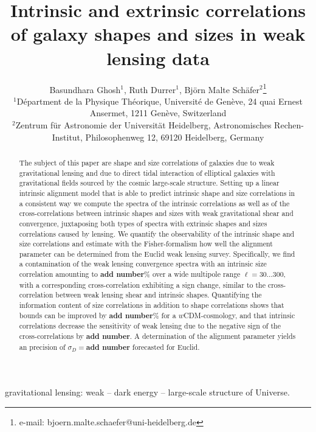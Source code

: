\documentclass[a4paper,fleqn,usenatbib]{mnras}
\title[Intrinsic sizes and shapes of galaxies]
{Intrinsic and extrinsic correlations of galaxy shapes and sizes in weak lensing data}
\author[B. Ghosh, R. Durrer, B.M. Sch{\"a}fer]
{Basundhara Ghosh$^1$, Ruth Durrer$^1$, Bj{\"o}rn Malte Sch{\"a}fer$^2$\thanks{e-mail: bjoern.malte.schaefer@uni-heidelberg.de}\\
$^1$D{\'e}partment de la Physique Th{\'e}orique, Universit{\'e} de Gen{\`e}ve, 24 quai Ernest Ansermet, 1211 Gen{\`e}ve, Switzerland\\
$^2$Zentrum f{\"u}r Astronomie der Universit{\"a}t Heidelberg, Astronomisches Rechen-Institut, Philosophenweg 12, 69120 Heidelberg, Germany
}
\def\spirou#1{{\bf #1}}
\begin{document}
\pagerange{\pageref{firstpage}--\pageref{lastpage}}
\maketitle
\label{firstpage}


\begin{abstract}
The subject of this paper are shape and size correlations of galaxies due to weak gravitational lensing and due to direct tidal interaction of elliptical galaxies with gravitational fields sourced by the cosmic large-scale structure. Setting up a linear intrinsic alignment model that is able to predict intrinsic shape and size correlations in a consistent way we compute the spectra of the intrinsic correlations as well as of the cross-correlations between intrinsic shapes and sizes with weak gravitational shear and convergence, juxtaposing both types of spectra with extrinsic shapes and sizes correlations caused by lensing. We quantify the observability of the intrinsic shape and size correlations and estimate with the Fisher-formalism how well the alignment parameter can be determined from the Euclid weak lensing survey. Specifically, we find a contamination of the weak lensing convergence spectra with an intrinsic size correlation amounting to \spirou{add number}\% over a wide multipole range $\ell=30\ldots300$, with a corresponding cross-correlation exhibiting a sign change, similar to the cross-correlation between weak lensing shear and intrinsic shapes. Quantifying the information content of size correlations in addition to shape correlations shows that bounds can be improved by \spirou{add number}\% for a $w$CDM-cosmology, and that intrinsic correlations decrease the sensitivity of weak lensing due to the negative sign of the cross-correlations by \spirou{add number}. A determination of the alignment parameter yields an precision of $\sigma_D=$\spirou{add number} forecasted for Euclid.
\end{abstract}


\begin{keywords}
gravitational lensing: weak -- dark energy -- large-scale structure of Universe.
\end{keywords}


\end{document}

